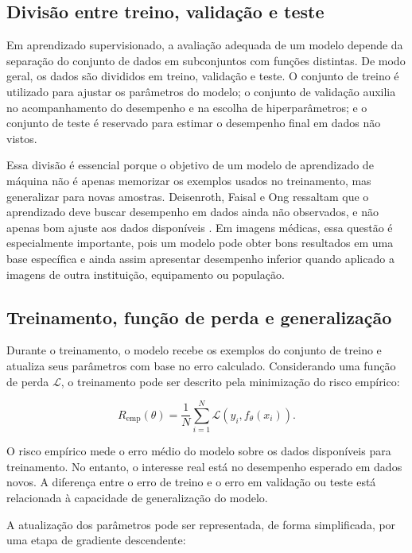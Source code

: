 \documentclass[
    12pt,
    openright,
    oneside,
    a4paper,
    english,
    brazil
]{abntex2}
\begin{document}
\subsection{Divisão entre treino, validação e teste}
\label{subsec:divisao_treino_validacao_teste}

Em aprendizado supervisionado, a avaliação adequada de um modelo depende da separação do conjunto de dados em subconjuntos com funções distintas. De modo geral, os dados são divididos em treino, validação e teste. O conjunto de treino é utilizado para ajustar os parâmetros do modelo; o conjunto de validação auxilia no acompanhamento do desempenho e na escolha de hiperparâmetros; e o conjunto de teste é reservado para estimar o desempenho final em dados não vistos.

Essa divisão é essencial porque o objetivo de um modelo de aprendizado de máquina não é apenas memorizar os exemplos usados no treinamento, mas generalizar para novas amostras. Deisenroth, Faisal e Ong ressaltam que o aprendizado deve buscar desempenho em dados ainda não observados, e não apenas bom ajuste aos dados disponíveis \cite{deisenroth2020mathematics}. Em imagens médicas, essa questão é especialmente importante, pois um modelo pode obter bons resultados em uma base específica e ainda assim apresentar desempenho inferior quando aplicado a imagens de outra instituição, equipamento ou população.

\subsection{Treinamento, função de perda e generalização}
\label{subsec:treinamento_funcao_perda_generalizacao}

Durante o treinamento, o modelo recebe os exemplos do conjunto de treino e atualiza seus parâmetros com base no erro calculado. Considerando uma função de perda \(\mathcal{L}\), o treinamento pode ser descrito pela minimização do risco empírico:

\[
R_{\text{emp}}(\theta)
=
\frac{1}{N}
\sum_{i=1}^{N}
\mathcal{L}(y_i, f_{\theta}(x_i)).
\]

O risco empírico mede o erro médio do modelo sobre os dados disponíveis para treinamento. No entanto, o interesse real está no desempenho esperado em dados novos. A diferença entre o erro de treino e o erro em validação ou teste está relacionada à capacidade de generalização do modelo.

A atualização dos parâmetros pode ser representada, de forma simplificada, por uma etapa de gradiente descendente:
\end{document}
